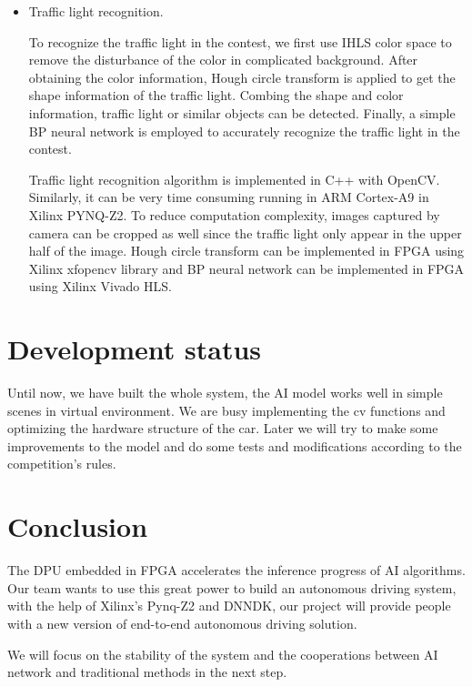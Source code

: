 \documentclass[conference]{IEEEtran}
\begin{document}
\begin{itemize}
\item Traffic light recognition.

To recognize the traffic light in the contest, we first use IHLS color space\cite{b19} to remove the disturbance of the color in complicated background. After obtaining the color information, Hough circle transform\cite{b20} is applied to get the shape information of the traffic light. Combing the shape and color information, traffic light or similar objects can be detected. Finally, a simple BP neural network is employed to accurately recognize the traffic light in the contest.

Traffic light recognition algorithm is implemented in C++ with OpenCV. Similarly, it can be very time consuming running in ARM Cortex-A9 in Xilinx PYNQ-Z2. To reduce computation complexity, images captured by camera can be cropped as well since the traffic light only appear in the upper half of the image. Hough circle transform can be implemented in FPGA using Xilinx xfopencv library and BP neural network can be implemented in FPGA using Xilinx Vivado HLS.

\end{itemize}

\section{Development status}

Until now, we have built the whole system, the AI model works well in simple scenes in virtual environment. We are busy implementing the cv functions and optimizing the hardware structure of the car. Later we will try to make some improvements to the model and do some tests and modifications according to the competition's rules. 

\section{Conclusion}

The DPU embedded in FPGA accelerates the inference progress of AI algorithms. Our team wants to use this great power to build an autonomous driving system, with the help of Xilinx's Pynq-Z2 and DNNDK, our project will provide people with a new version of end-to-end autonomous driving solution.

We will focus on the stability of the system and the cooperations between AI network and traditional methods in the next step.
\end{document}

